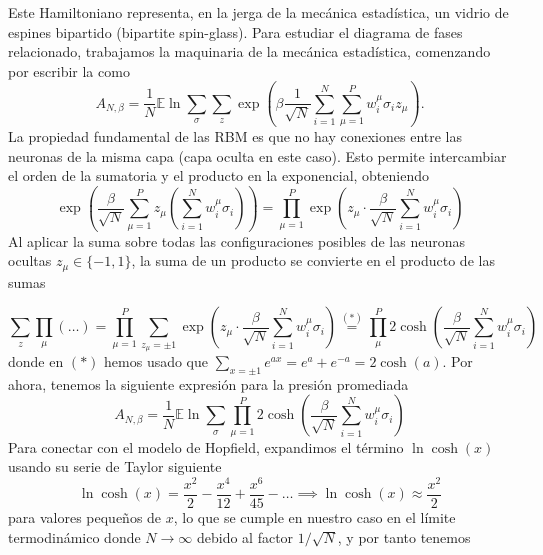 \noindent
Este Hamiltoniano representa, en la jerga de la mecánica estadística, un vidrio de espines bipartido (bipartite spin-glass). Para estudiar el diagrama de fases relacionado, trabajamos la maquinaria de la mecánica estadística, comenzando por escribir la  como
\begin{equation*}
    A_{N, \beta} = \frac{1}{N} \mathbb{E} \ln \sum_{\sigma} \sum_{z} \exp \left( \beta \frac{1}{\sqrt{N}} \sum_{i=1}^N \sum_{\mu=1}^P w_{i}^{\mu} \sigma_i z_\mu \right).
\end{equation*}
La propiedad fundamental de las RBM es que no hay conexiones entre las neuronas de la misma capa (capa oculta en este caso). Esto permite intercambiar el orden de la sumatoria y el producto en la exponencial, obteniendo
\begin{equation*}
    \exp \left( \frac{\beta}{\sqrt{N}} \sum_{\mu=1}^P z_\mu \left( \sum_{i=1}^N w_i^\mu \sigma_i \right) \right) = \prod_{\mu=1}^P \exp \left( z_\mu \cdot \frac{\beta}{\sqrt{N}} \sum_{i=1}^N w_i^\mu \sigma_i \right)
\end{equation*}
Al aplicar la suma sobre todas las configuraciones posibles de las neuronas ocultas $z_\mu \in \{-1, 1\}$, la suma de un producto se convierte en el producto de las sumas

\begin{equation*}
    \sum_z \prod_\mu (\dots) = \prod_{\mu=1}^P \sum_{z_\mu = \pm 1} \exp \left( z_\mu \cdot \frac{\beta}{\sqrt{N}} \sum_{i=1}^N w_i^\mu \sigma_i \right)\overset{(*)}{=}\prod_{\mu}^P 2 \cosh \left( \frac{\beta}{\sqrt{N}} \sum_{i=1}^N w_i^\mu \sigma_i \right)
\end{equation*}
donde en $(*)$ hemos usado que $\sum\limits_{x = \pm 1} e^{ax} = e^a + e^{-a} = 2 \cosh(a)$. Por ahora, tenemos la siguiente expresión para la presión promediada
\begin{equation*}
    A_{N, \beta} = \frac{1}{N} \mathbb{E} \ln \sum_{\sigma} \prod_{\mu=1}^P 2 \cosh \left( \frac{\beta}{\sqrt{N}} \sum_{i=1}^N w_i^\mu \sigma_i \right)
\end{equation*}
Para conectar con el modelo de Hopfield, expandimos el término $\ln \cosh(x)$ usando su serie de Taylor siguiente 
\begin{equation*}
    \ln \cosh(x) = \frac{x^2}{2} - \frac{x^4}{12} + \frac{x^6}{45} - \ldots \implies \ln \cosh(x) \approx \frac{x^2}{2}
\end{equation*}
para valores pequeños de $x$, lo que se cumple en nuestro caso en el límite termodinámico donde $N \to \infty$ debido al factor $1/\sqrt{N}$, y por tanto tenemos


